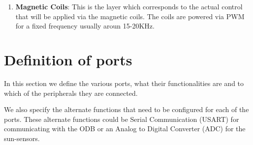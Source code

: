 \documentclass[11pt,a4paper]{report}
\begin{document}
\begin{enumerate}
\item 
\textbf{Magnetic Coils}: This is the layer which corresponds to the actual control that will be applied via the magnetic coils. The coils are powered via PWM for a fixed frequency usually aroun 15-20KHz. 
\end{enumerate}


\section{Definition of ports}

In this section we define the various ports, what their functionalities are and to which of the peripherals they are connected. 

We also specify the alternate functions that need to be configured for each of the ports. These alternate functions could be Serial Communication (USART) for communicating with the ODB or an Analog to Digital Converter (ADC) for the sun-sensors. 
\end{document}
